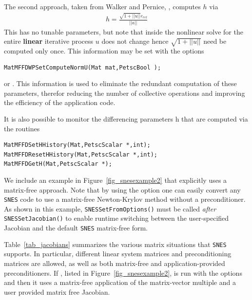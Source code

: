 The second approach, taken from Walker and Pernice, \cite{pw98}, computes $ h $ via
\begin{eqnarray*}
        h = \frac{\sqrt{1 + ||u||}e_{rel}}{||a||}
\end{eqnarray*}
This has no tunable parameters, but note that inside the nonlinear solve for
the entire {\bf linear} iterative process $ u $ does not change hence
$\sqrt{1 + ||u||} $ need be computed only once. This information may be set with the
options
\begin{lstlisting}
MatMFFDWPSetComputeNormU(Mat mat,PetscBool );
\end{lstlisting}
or .
This information is used to eliminate the redundant computation of these parameters,
therefor reducing the number of collective operations and improving the efficiency of the
         application code.

It is also possible to monitor the differencing parameters h that are computed
via the routines
\begin{lstlisting}
MatMFFDSetHHistory(Mat,PetscScalar *,int);
MatMFFDResetHHistory(Mat,PetscScalar *,int);
MatMFFDGetH(Mat,PetscScalar *);
\end{lstlisting}

We include an example in Figure~\ref{fig_snesexample2} that explicitly
uses a matrix-free approach.  Note that by using the option
 one can easily convert any \lstinline{SNES} code to use a matrix-free
Newton-Krylov method without a preconditioner.  As shown in this
example, \lstinline{SNESSetFromOptions()} must be called {\em after}
\lstinline{SNESSetJacobian()} to enable runtime switching between the
user-specified Jacobian and the default \lstinline{SNES} matrix-free form.

Table~\ref{tab_jacobians} summarizes the various matrix situations
that \lstinline{SNES} supports.  In particular, different linear system matrices
and preconditioning matrices are allowed, as well as both matrix-free
and application-provided preconditioners.  If
\href{https://www.mcs.anl.gov/petsc/petsc-current/src/snes/examples/tutorials/ex3.c.html}{},
 listed in Figure~\ref{fig_snesexample2}, is run with the options  and  then it uses a matrix-free application of the matrix-vector multiple and a user provided matrix free Jacobian.

